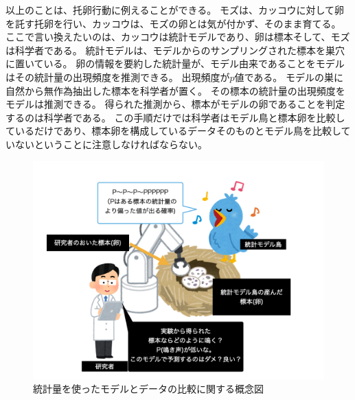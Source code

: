 

以上のことは、托卵行動に例えることができる。
モズは、カッコウに対して卵を託す托卵を行い、カッコウは、モズの卵とは気が付かず、そのまま育てる。
ここで言い換えたいのは、カッコウは統計モデルであり、卵は標本そして、モズは科学者である。
統計モデルは、モデルからのサンプリングされた標本を巣穴に置いている。
卵の情報を要約した統計量が、モデル由来であることをモデルはその統計量の出現頻度を推測できる。
出現頻度が$p$値である。
モデルの巣に自然から無作為抽出した標本を科学者が置く。
その標本の統計量の出現頻度をモデルは推測できる。
得られた推測から、標本がモデルの卵であることを判定するのは科学者である。
この手順だけでは科学者はモデル鳥と標本卵を比較しているだけであり、標本卵を構成しているデータそのものとモデル鳥を比較していないということに注意しなければならない。


\begin{figure}
    \begin{center}
        \includegraphics[bb=0 0 1024 768,width=15cm]{./image/01_/conceptual_diagram/conceptual_diagram.003.png}
        \caption{統計量を使ったモデルとデータの比較に関する概念図}
        \label{fig:conceptual_diagram_test}
    \end{center}
\end{figure}


